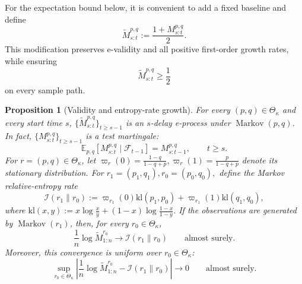 \documentclass[12pt]{article}
\DeclareMathOperator{\Markov}{Markov}
\theoremstyle{spaced}
\newtheorem{proposition}[proposition]{Proposition}
\theoremstyle{remark}
\newcommand{\kl}{\mathrm{kl}}
\begin{document}
For the expectation bound below, it is convenient to add a fixed
baseline and define
\begin{equation}
\label{eq:markov-baseline-eprocess}
    \widetilde M_{s:t}^{p,q}
    :=
    \frac{1+M_{s:t}^{p,q}}{2}.
\end{equation}
This modification preserves e-validity and all positive first-order
growth rates, while ensuring
\[
    \widetilde M_{s:t}^{p,q}\ge\frac12
\]
on every sample path.

\begin{proposition}[Validity and entropy-rate growth]
\label{prop:markov-validity-growth}
For every \((p,q)\in\Theta_\kappa\) and every start time \(s\),
$\{\widetilde M_{s:t}^{p,q}\}_{t\ge s-1}$
is an \(s\)-delay e-process under \(\Markov(p,q)\).  In fact,
\(\{M_{s:t}^{p,q}\}_{t\ge s-1}\) is a test martingale:
\[
    \mathbb E_{p,q}
    \left[
        M_{s:t}^{p,q}
        \mid\mathcal F_{t-1}
    \right]
    =
    M_{s:t-1}^{p,q},
    \qquad t\ge s.
\]
For \(r=(p,q)\in\Theta_\kappa\), let
$  \varpi_r(0)
    =
    \frac{1-q}{1-q+p},
    \varpi_r(1)
    =
    \frac{p}{1-q+p}$
denote its stationary distribution.  For
$r_1=(p_1,q_1),
    r_0=(p_0,q_0),$
define the Markov relative-entropy rate
\begin{equation}
\label{eq:markov-information-rate}
    \mathcal I(r_1\|r_0)
    :=
    \varpi_{r_1}(0)
    \kl(p_1,p_0)
    +
    \varpi_{r_1}(1)
    \kl(q_1,q_0),
\end{equation}
where
$ \kl(x,y)
    :=
    x\log\frac{x}{y}
    +(1-x)\log\frac{1-x}{1-y}.$
If the observations are generated by \(\Markov(r_1)\), then, for
every \(r_0\in\Theta_\kappa\),
\[
    \frac1n
    \log\widetilde M_{1:n}^{r_0}
    \longrightarrow
    \mathcal I(r_1\|r_0)
    \qquad\text{almost surely}.
\]
Moreover, this convergence is uniform over \(r_0\in\Theta_\kappa\):
\begin{equation}
\label{eq:markov-uniform-growth}
    \sup_{r_0\in\Theta_\kappa}
    \left|
        \frac1n\log\widetilde M_{1:n}^{r_0}
        -
        \mathcal I(r_1\|r_0)
    \right|
    \longrightarrow0
    \qquad\text{almost surely}.
\end{equation}
\end{proposition}
\end{document}
